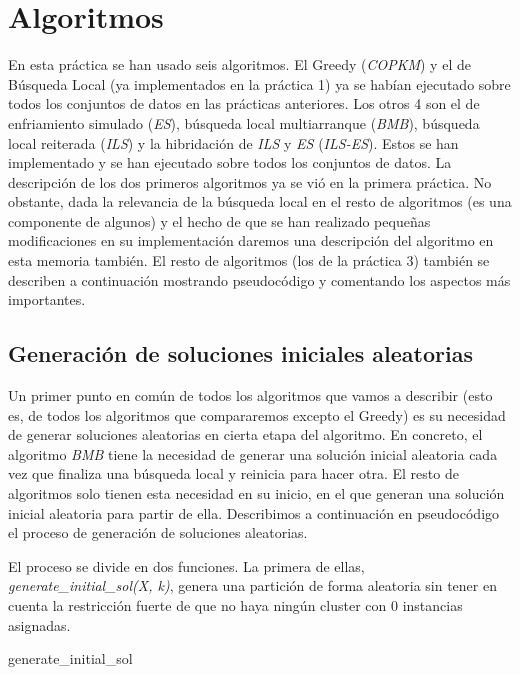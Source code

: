 \documentclass[11pt,a4paper]{article}
\begin{document}
	\section{Algoritmos}
	En esta práctica se han usado seis algoritmos. El Greedy (\textit{COPKM}) y el de Búsqueda Local (ya implementados en la práctica 1) ya se habían ejecutado sobre todos los conjuntos de datos en las prácticas anteriores. Los otros 4 son el de enfriamiento simulado (\textit{ES}), búsqueda local multiarranque (\textit{BMB}), búsqueda local reiterada (\textit{ILS}) y la hibridación de \textit{ILS} y \textit{ES} (\textit{ILS-ES}). Estos se han implementado y se han ejecutado sobre todos los conjuntos de datos. La descripción de los dos primeros algoritmos  ya se vió en la primera práctica. No obstante, dada la relevancia de la búsqueda local en el resto de algoritmos (es una componente de algunos) y el hecho de que se han realizado pequeñas modificaciones en su implementación daremos una descripción del algoritmo en esta memoria también. El resto de algoritmos (los de la práctica 3) también se describen a continuación mostrando pseudocódigo y comentando los aspectos más importantes. 
	
	\subsection{Generación de soluciones iniciales aleatorias}
	Un primer punto en común de todos los algoritmos que vamos a describir (esto es, de todos los algoritmos que compararemos excepto el Greedy) es su necesidad de generar soluciones aleatorias en cierta etapa del algoritmo. En concreto, el algoritmo \textit{BMB} tiene la necesidad de generar una solución inicial aleatoria cada vez que finaliza una búsqueda local y reinicia para hacer otra. El resto de algoritmos solo tienen esta necesidad en su inicio, en el que generan una solución inicial aleatoria para partir de ella. Describimos a continuación en pseudocódigo el proceso de generación de soluciones aleatorias.
	
	 El proceso se divide en dos funciones. La primera de ellas, \textit{generate\_initial\_sol(X, k)}, genera una partición de forma aleatoria sin tener en cuenta la restricción fuerte de que no haya ningún cluster con 0 instancias asignadas.
	
    \begin{algorithm}[H]
	 	\caption{generate\_initial\_sol}
	\end{algorithm}
	
\end{document}
